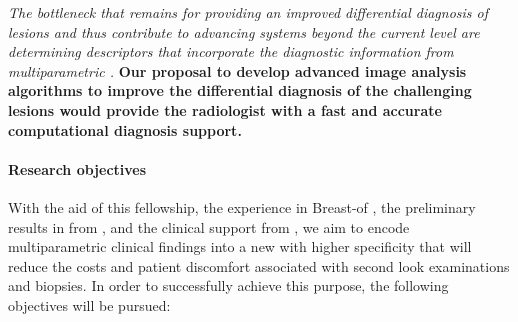 \emph{The bottleneck that remains for providing an improved differential
diagnosis of \nmle lesions and thus contribute to advancing
\cad systems beyond the current level are determining descriptors that
incorporate the diagnostic information from multiparametric \mri.}
\textbf{Our proposal to develop advanced image analysis algorithms to improve
the differential diagnosis of the challenging \nmle lesions
would provide the radiologist with a fast and accurate computational diagnosis
support.}


\paragraph{Research objectives}

With the aid of this fellowship, the experience in Breast-\cad of \vicorob, the preliminary results in \cemri from \florida, and the clinical support from \udiat, we aim to encode multiparametric \mri clinical findings into a new \cad with higher specificity that will reduce the costs and patient discomfort associated with second look examinations and biopsies.
In order to successfully achieve this purpose, the following objectives will be pursued:

